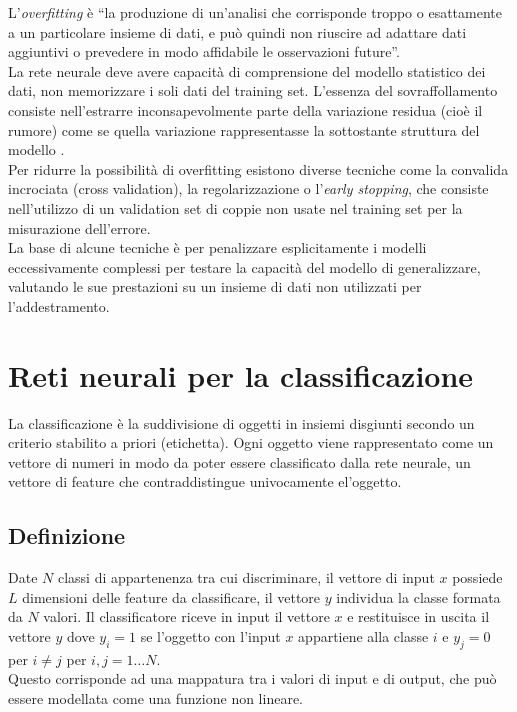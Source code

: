 L'\emph{overfitting} è ``la produzione di un'analisi che corrisponde troppo o esattamente a un particolare insieme di dati, e può quindi non riuscire ad adattare dati aggiuntivi o prevedere in modo affidabile le osservazioni future''.\\
La rete neurale deve avere capacità di comprensione del modello statistico dei dati, non memorizzare i soli dati del training set. L'essenza del sovraffollamento consiste nell'estrarre inconsapevolmente parte della variazione residua (cioè il rumore) come se quella variazione rappresentasse la sottostante struttura del modello \cite{burnham2003model}.\\
Per ridurre la possibilità di overfitting esistono diverse tecniche come la convalida incrociata (cross validation), la regolarizzazione o l'\emph{early stopping}, che consiste nell'utilizzo di un validation set di coppie non usate nel training set per la misurazione dell'errore.\\
La base di alcune tecniche è per penalizzare esplicitamente i modelli eccessivamente complessi per testare la capacità del modello di generalizzare, valutando le sue prestazioni su un insieme di dati non utilizzati per l'addestramento.

\section{Reti neurali per la classificazione}
\label{sec:classificazione}
La classificazione è la suddivisione di oggetti in insiemi disgiunti secondo un criterio stabilito a priori (etichetta). Ogni oggetto viene rappresentato come un vettore di numeri in modo da poter essere classificato dalla rete neurale, un vettore di feature che contraddistingue univocamente el'oggetto.\\
\subsection{Definizione}
\label{subsec:defclass}
Date $N$ classi di appartenenza tra cui discriminare, il vettore di input $x$ possiede $L$ dimensioni delle feature da classificare, il vettore $y$ individua la classe formata da $N$ valori. Il classificatore riceve in input il vettore $x$ e restituisce in uscita il vettore $y$ dove $y_i=1$ se l'oggetto con l'input $x$ appartiene alla classe $i$ e $y_j=0$ per $i\neq j$ per $i,j=1 \dots N$.\\
Questo corrisponde ad una mappatura tra i valori di input e di output, che può essere modellata come una funzione non lineare.

